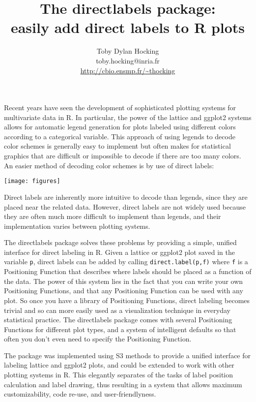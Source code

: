 \documentclass[12pt]{article}
\title{The directlabels package:\\ easily add direct
  labels to R plots}
\author{Toby Dylan Hocking\\
  toby.hocking@inria.fr\\
  \url{http://cbio.ensmp.fr/~thocking}
}
\begin{document}
\maketitle

Recent years have seen the development of sophisticated plotting
systems for multivariate data in R. In particular, the power of the
lattice and ggplot2 systems allows for automatic legend generation for
plots labeled using different colors according to a categorical
variable. This approach of using legends to decode color schemes is
generally easy to implement but often makes for statistical graphics
that are difficult or impossible to decode if there are too many
colors. An easier method of decoding color schemes is by use of direct
labels:

\begin{center}
\texttt{[image: figures]}
\end{center}

Direct labels are inherently more intuitive to decode than legends,
since they are placed near the related data. However, direct labels
are not widely used because they are often much more difficult to
implement than legends, and their implementation varies between
plotting systems.

The directlabels package solves these problems by providing a simple,
unified interface for direct labeling in R. Given a lattice or ggplot2
plot saved in the variable \texttt{p}, direct labels can be added by
calling \texttt{direct.label(p,f)} where \texttt{f} is a Positioning
Function that describes where labels should be placed as a function of
the data. The power of this system lies in the fact that you can write
your own Positioning Functions, and that any Positioning Function can
be used with any plot. So once you have a library of Positioning
Functions, direct labeling becomes trivial and so can more easily used
as a visualization technique in everyday statistical practice. The
directlabels package comes with several Positioning Functions for
different plot types, and a system of intelligent defaults so that
often you don't even need to specify the Positioning Function.

The package was implemented using S3 methods to provide a unified
interface for labeling lattice and ggplot2 plots, and could be
extended to work with other plotting systems in R. This elegantly
separates of the tasks of label position calculation and label
drawing, thus resulting in a system that allows maximum
customizability, code re-use, and user-friendlyness.
\end{document}
